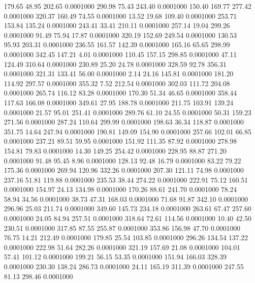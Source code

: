  179.65   48.95  202.65   0.0001000
 290.98   75.43  243.40   0.0001000
 150.40  169.77  277.42   0.0001000
 320.37  160.49   74.55   0.0001000
  13.52   19.68  109.40   0.0001000
 253.71  153.84  135.24   0.0001000
 243.41   33.41  210.11   0.0001000
 257.14   19.04  299.26   0.0001000
  91.49   75.94   17.87   0.0001000
 320.19  152.69  249.54   0.0001000
 130.53   95.93  203.31   0.0001000
 236.55  161.57  142.39   0.0001000
 165.16   65.65  298.99   0.0001000
 342.45  147.21    4.01   0.0001000
 110.45  157.15  298.85   0.0001000
  47.11  124.49  310.64   0.0001000
 230.89   25.20   24.78   0.0001000
 328.59   92.78  356.31   0.0001000
 321.31  133.41   56.00   0.0001000
   2.14   24.16  145.81   0.0001000
 181.20  114.92  297.57   0.0001000
 355.32    7.52  212.54   0.0001000
 302.03  111.72  204.08   0.0001000
 265.74  116.12   83.28   0.0001000
 170.30   51.34   46.65   0.0001000
 358.44  117.63  166.08   0.0001000
 349.61   27.95  188.78   0.0001000
 211.75  103.91  139.24   0.0001000
  21.57   95.01  251.41   0.0001000
 289.76   61.10   24.55   0.0001000
  50.31  159.23  271.56   0.0001000
 287.24  110.64  299.99   0.0001000
 198.63   36.34  118.87   0.0001000
 351.75   14.64  247.94   0.0001000
 190.81  149.09  154.90   0.0001000
 257.66  102.01   66.85   0.0001000
 237.21   89.51   59.95   0.0001000
 151.92  111.35   87.92   0.0001000
 278.98  154.81   79.83   0.0001000
  14.30  149.25  254.42   0.0001000
 228.95   88.87  271.20   0.0001000
  91.48   95.45    8.96   0.0001000
 128.13   92.48   16.79   0.0001000
  83.22   79.22  175.36   0.0001000
 269.94  120.96  332.26   0.0001000
 207.30  121.11   74.98   0.0001000
 237.16   51.81  119.88   0.0001000
 235.53   38.44  274.22   0.0001000
 222.91   75.12  160.51   0.0001000
 154.97   24.13  134.98   0.0001000
 170.26   88.61  241.70   0.0001000
  78.24   58.94   34.56   0.0001000
  38.73   47.31  168.03   0.0001000
  71.68   91.87  342.10   0.0001000
 296.96   25.03  211.74   0.0001000
 349.60  145.73  234.18   0.0001000
 263.61   67.47  257.60   0.0001000
  24.05   84.94  257.51   0.0001000
 318.64   72.61  114.56   0.0001000
  10.40   42.50  230.51   0.0001000
 317.85   87.55  255.87   0.0001000
 353.86  156.98   47.70   0.0001000
  76.75   14.21  212.49   0.0001000
 179.85   25.54  103.85   0.0001000
 296.26  134.54  137.22   0.0001000
 222.98   51.64  282.26   0.0001000
 321.19  157.69   21.08   0.0001000
 104.01   57.41  101.12   0.0001000
 199.21   56.15   53.35   0.0001000
 151.94  166.03  328.39   0.0001000
 230.30  138.24  286.73   0.0001000
  24.11  165.19  311.39   0.0001000
 247.55   81.13  298.46   0.0001000
